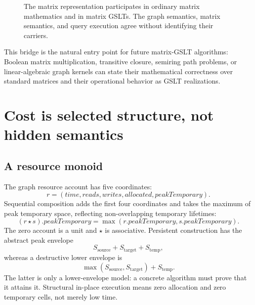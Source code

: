 \documentclass[11pt]{article}
\theoremstyle{remark}
\newcommand{\Fin}{\mathsf{Fin}}
\begin{document}
\begin{figure}[htbp]
\centering
{}
\caption{The matrix representation participates in ordinary matrix
mathematics and in matrix GSLTs.  The graph semantics, matrix semantics, and
query execution agree without identifying their carriers.}
\label{fig:matrix-bridge}
\end{figure}

This bridge is the natural entry point for future matrix-GSLT algorithms:
Boolean matrix multiplication, transitive closure, semiring path problems, or
linear-algebraic graph kernels can state their mathematical correctness over
standard matrices and their operational behavior as GSLT realizations.

\section{Cost is selected structure, not hidden semantics}
\label{sec:cost}

\subsection{A resource monoid}

The graph resource account has five coordinates:
\[
  r=(\mathit{time},\mathit{reads},\mathit{writes},
      \mathit{allocated},\mathit{peakTemporary}).
\]
Sequential composition adds the first four coordinates and takes the maximum
of peak temporary space, reflecting non-overlapping temporary lifetimes:
\[
  (r\mathbin{\star}s).\mathit{peakTemporary}
    =\max(r.\mathit{peakTemporary},s.\mathit{peakTemporary}).
\]
The zero account is a unit and \(\star\) is associative.  Persistent
construction has the abstract peak envelope
\[
  S_{\mathrm{source}}+S_{\mathrm{target}}+S_{\mathrm{temp}},
\]
whereas a destructive lower envelope is
\[
  \max(S_{\mathrm{source}},S_{\mathrm{target}})+S_{\mathrm{temp}}.
\]
The latter is only a lower-envelope model: a concrete algorithm must prove
that it attains it.  Structural in-place execution means zero allocation and
zero temporary cells, not merely low time.
\end{document}
